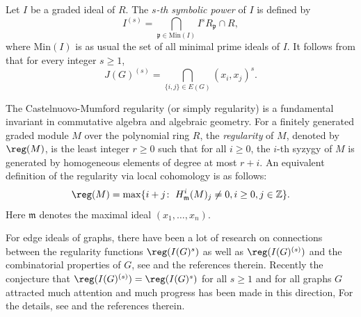 \documentclass[12pt]{amsart}
\let\:=\colon
\begin{document}
Let $I$ be a graded ideal of $R$. The $s${\it -th symbolic power} of $I$ is defined by $$I^{(s)}=\bigcap_{\mathfrak{p}\in \mathrm{Min}(I)}I^sR_{\mathfrak{p}}\cap R,$$
where $\mathrm{Min}(I)$ is as usual the set of all minimal prime ideals of $I$.  It follows from  \cite[Proposition 1.4.4]{HH} that for every integer $s\geq 1$,  $$J(G)^{(s)}=\bigcap_{\{i,j\}\in E(G)}(x_i,x_j)^s.$$

The Castelnuovo-Mumford regularity (or simply regularity) is a fundamental invariant in commutative
algebra and algebraic geometry. For a  finitely generated graded module $M$ over the polynomial ring $R$, the {\it regularity} of $M$, denoted by $\reg(M)$,  is the least integer $r\geq 0$ such that for all $i\geq 0$,  the $i$-th syzygy of $M$ is generated by homogeneous elements of degree at most $r+i$. An equivalent definition of the regularity via local cohomology is as follows:$$\reg(M)=\max\{i+j\:\; H^i_{\mathfrak{m}}(M)_j\neq 0, i\geq 0, j\in \mathbb{Z}\}.$$ Here $\mathfrak{m}$ denotes the maximal  ideal $(x_1,\ldots,x_n)$.



For edge ideals of graphs, there have been a lot of research on connections between
the regularity functions $\reg(I(G)^s)$ as well as $\reg(I(G)^{(s)})$ and  the combinatorial properties of $G$, see \cite{BBH} and the references therein. Recently the conjecture that  $\reg(I(G)^{(s)})= \reg(I(G)^s)$  for all $s\geq 1$ and for all graphs $G$ attracted much attention and much progress has been made in this direction, For the details, see  \cite{JK} and the references therein.
\end{document}
